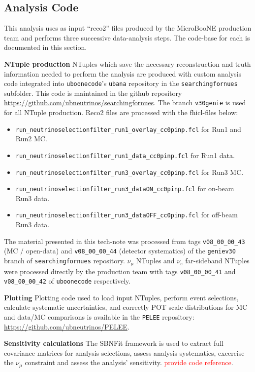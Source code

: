 \subsection{Analysis Code}
\par This analysis uses as input ``reco2'' files produced by the MicroBooNE production team and performs three successive data-analysis steps. The code-base for each is documented in this section.
\par \textbf{NTuple production} NTuples which save the necessary reconstruction and truth information needed to perform the analysis are produced with custom analysis code integrated into \texttt{uboonecode}'s \texttt{ubana} repository in the \texttt{searchingfornues} subfolder. This code is maintained in the github repository \url{https://github.com/ubneutrinos/searchingfornues}. The branch \texttt{v30genie} is used for all NTuple production. Reco2 files are processed with the fhicl-files below:
\begin{itemize}
    \item \texttt{run\_neutrinoselectionfilter\_run1\_overlay\_cc0pinp.fcl} for Run1 and Run2 MC.
    \item \texttt{run\_neutrinoselectionfilter\_run1\_data\_cc0pinp.fcl} for Run1 data.
    \item \texttt{run\_neutrinoselectionfilter\_run3\_overlay\_cc0pinp.fcl} for Run3 MC.
    \item \texttt{run\_neutrinoselectionfilter\_run3\_dataON\_cc0pinp.fcl} for on-beam Run3 data.
    \item \texttt{run\_neutrinoselectionfilter\_run3\_dataOFF\_cc0pinp.fcl} for off-beam Run3 data.
\end{itemize}
The material presented in this tech-note was processed from tags \texttt{v08\_00\_00\_43} (MC / open-data) and \texttt{v08\_00\_00\_44} (detector systematics) of the \texttt{geniev30} branch of \texttt{searchingfornues} repository. $\nu_{\mu}$ NTuples and $\nu_e$ far-sideband NTuples were processed directly by the production team with tags \texttt{v08\_00\_00\_41} and \texttt{v08\_00\_00\_42} of \texttt{uboonecode} respectively.
\par \textbf{Plotting} Plotting code used to load input NTuples, perform event selections, calculate systematic uncertainties, and correctly POT scale distributions for MC and data/MC comparisons is available in the \texttt{PELEE} repository: \url{https://github.com/ubneutrinos/PELEE}.
\par \textbf{Sensitivity calculations} The SBNFit framework is used to extract full covariance matrices for analysis selections, assess analysis systematics, excercise the $\nu_{\mu}$ constraint and assess the analysis' sensitivity. \textcolor{red}{provide code reference}.

